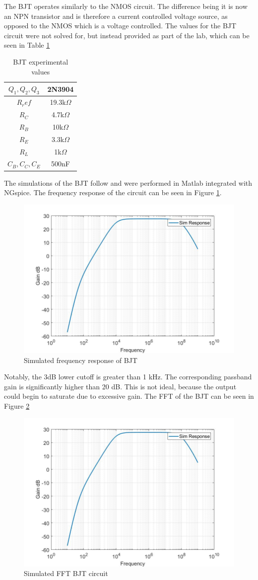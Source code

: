 
The BJT operates similarly to the NMOS circuit. The difference being it is now an NPN transistor and is therefore a current controlled voltage source, as opposed to the NMOS which is a voltage controlled. The values for the BJT circuit were not solved for, but instead provided as part of the lab, which can be seen in Table \ref{tab:bjttab}

\begin{table}[H]
	\centering
	\caption{BJT experimental values}
	\label{tab:bjttab}
	\begin{tabular}{|c|c|} \hline
		$Q_1, Q_2, Q_3$ & 2N3904        \\ \hline
		$R_ref$         & 19.3k$\Omega$ \\ \hline
		$R_C$           & 4.7k$\Omega$  \\ \hline
		$R_B$           & 10k$\Omega$   \\ \hline
		$R_E$           & 3.3k$\Omega$  \\ \hline
		$R_L$           & 1k$\Omega$    \\ \hline
		$C_B, C_C, C_E$ & 500nF      \\   \hline
	\end{tabular}
\end{table}

 The simulations of the BJT follow and were performed in Matlab integrated with NGspice. The frequency response of the circuit can be seen in Figure \ref{fig:bjtsimfreq}. 

\begin{figure}[H]
	\centering
	\includegraphics[width=.55\textwidth]{CircuitDevelopment/BJT_bandwidth.jpg}
	\caption{Simulated frequency response of BJT}
	\label{fig:bjtsimfreq}
\end{figure}

Notably, the 3dB lower cutoff is greater than 1 kHz. The corresponding passband gain is significantly higher than 20 dB. This is not ideal, because the output could begin to saturate due to excessive gain. The FFT of the BJT can be seen in Figure \ref{fig:bjtFFT}

\begin{figure}[H]
	\centering
	\includegraphics[width=.55\textwidth]{CircuitDevelopment/BJT_bandwidth.jpg}
	\caption{Simulated FFT BJT circuit}
	\label{fig:bjtFFT}
\end{figure}



 



